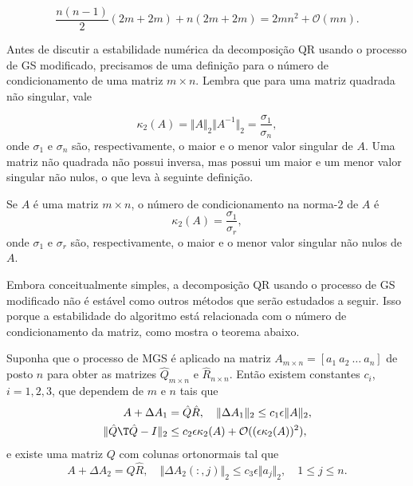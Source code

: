 \documentclass{article}
\begin{document}
\[
    \frac{n(n-1)}{2} (2m + 2m) + n(2m + 2m) = 2mn^2 + \mathcal{O}(mn).
\]

Antes de discutir a estabilidade numérica da decomposição QR usando o processo de GS modificado, precisamos de uma definição para o número de condicionamento de uma matriz \(m \times n\). Lembra que para uma matriz quadrada não singular, vale

\begin{equation}
    \kappa_2(A) = \Vert A \Vert_2 \Vert A^{-1} \Vert_2 = \frac{\sigma_1}{\sigma_n},
\end{equation}
onde \(\sigma_1\) e \(\sigma_n\) são, respectivamente, o maior e o menor valor singular de \(A\). Uma matriz não quadrada não possui inversa, mas possui um maior e um menor valor singular não nulos, o que leva à seguinte definição.

\begin{defn}
    Se \(A\) é uma matriz \(m \times n\), o número de condicionamento na norma-\(2\) de \(A\) é
    \begin{equation}
        \kappa_2(A) = \frac{\sigma_1}{\sigma_r},
    \end{equation}
    onde \(\sigma_1\) e \(\sigma_r\) são, respectivamente, o maior e o menor valor singular não nulos de \(A\).
\end{defn}

Embora conceitualmente simples, a decomposição QR usando o processo de GS modificado não é estável como outros métodos que serão estudados a seguir. Isso porque a estabilidade do algoritmo está relacionada com o número de condicionamento da matriz, como mostra o teorema abaixo.

\begin{thm}
    Suponha que o processo de MGS é aplicado na matriz \(A_{m \times n} = [a_1 \ a_2 \ \ldots \ a_n]\) de posto \(n\) para obter as matrizes \(\hat{Q}_{m \times n}\) e \(\hat{R}_{n \times n}\). Então existem constantes \(c_i\), \(i = 1, 2, 3\), que dependem de \(m\) e \(n\) tais que
    \begin{align*}
        A + \Delta A_1 &= \hat{Q} \hat{R}, \quad \Vert \Delta A_1 \Vert_2 \leq c_1 \epsilon \Vert A \Vert_2, \\
        \Vert \hat{Q}\T  \hat{Q} - I \Vert_2 &\leq c_2 \epsilon \kappa_2(A) + \mathcal{O}((\epsilon \kappa_2(A))^2),
    \end{align*}
    e existe uma matriz \(Q\) com colunas ortonormais tal que
    \begin{equation*}
        A + \Delta A_2 = Q \hat{R}, \quad \Vert \Delta A_2 (:,j) \Vert_2 \leq c_3 \epsilon \Vert a_j \Vert_2, \quad 1 \leq j \leq n.
    \end{equation*}
\end{thm}
\end{document}
